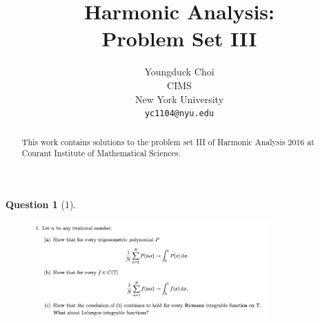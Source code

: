\documentclass{article} %
\title{Harmonic Analysis:  \\
Problem Set III}
\author{
Youngduck Choi \\
CIMS \\
New York University\\
\texttt{yc1104@nyu.edu} \\
}
\theoremstyle{quest}
\newtheorem*{question}{Question}
\begin{document}
\maketitle

\begin{abstract}
This work contains solutions to the problem set III
of Harmonic Analysis 2016 at Courant Institute of Mathematical Sciences.
\end{abstract}

\begin{question}[1]
\hfill
\begin{figure}[h!]
  \centering
    \includegraphics[width=0.8\textwidth]{HA-3-1.png}
\end{figure}
\end{question}
\end{document}
